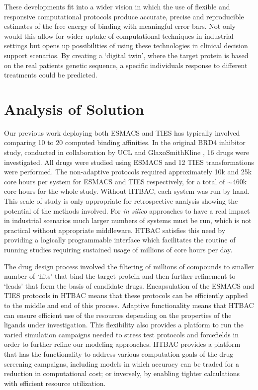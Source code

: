 \documentclass[conference]{IEEEtran}
\begin{document}
These developments fit into a wider vision in which the use of
flexible and responsive computational protocols produce accurate,
precise and reproducible estimates of the free energy of binding with
meaningful error bars. Not only would this allow for wider uptake of
computational techniques in industrial settings but opens up possibilities
of using these technologies in clinical decision support scenarios. By creating
a `digital twin', where the target protein is based on the real patients
genetic sequence, a specific individuals response to different
treatments could be predicted.


\section{Analysis of Solution}\label{sec:analysis}

Our previous work deploying both ESMACS and TIES has typically involved 
comparing 10 to 20 computed binding affinities. In the original BRD4 inhibitor 
study, conducted in collaboration by UCL and GlaxoSmithKline \cite{Wan2017brd4}, 
16 drugs were investigated. All drugs were studied using ESMACS and 12 TIES 
transformations were performed. The non-adaptive protocols required 
approximately 10k and 25k core hours per system for ESMACS and TIES 
respectively, for a total of  $\sim$460k core hours for the whole study. Without 
HTBAC, each system was run by hand. This scale of study is only appropriate for 
retrospective analysis showing the potential of the methods involved. For 
\textit{in silico} approaches to have a real impact in industrial scenarios much 
larger numbers of systems must be run, which is not practical without 
appropriate middleware. HTBAC satisfies this need by providing a logically 
programmable interface which facilitates the routine of running studies 
requiring sustained usage of millions of core hours per day.

The drug design process involved the filtering of millions of compounds to 
smaller number of `hits' that bind the target protein and then further 
refinement to `leads' that form the basis of candidate drugs. Encapsulation of 
the ESMACS and TIES protocols in HTBAC means that these protocols can be 
efficiently applied to the middle and end of this process. Adaptive 
functionality means that HTBAC can ensure efficient use of the resources 
depending on the properties of the ligands under investigation. This flexibility 
also provides a platform to run the varied simulation campaigns needed to stress 
test protocols and forcefields in order to further refine our modeling approaches.
HTBAC provides a platform that has the functionality to address various 
computation goals of the drug screening campaigns, including models in which 
accuracy can be traded for a reduction in computational cost; or inversely, by 
enabling tighter calculations with efficient resource utilization. 
\end{document}
